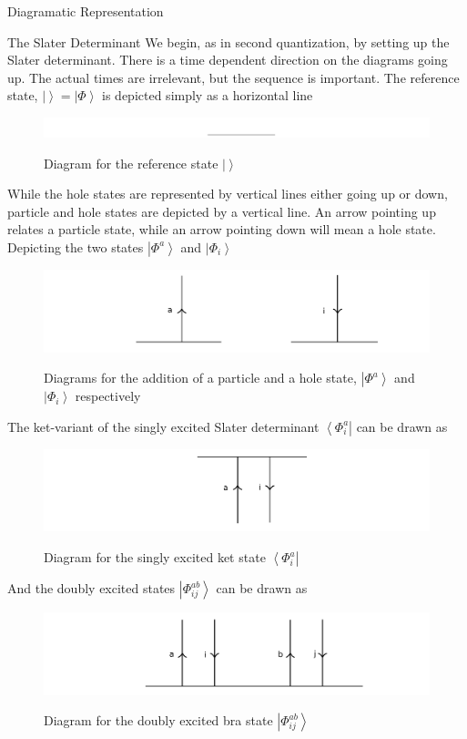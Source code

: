 \documentclass[twoside,english]{uiofysmaster}
\begin{document}
\begin{chapter}{Diagramatic Representation}
	\begin{section}{The Slater Determinant}
		We begin, as in second quantization, by setting up the Slater determinant. There is a time dependent direction on the diagrams going up. The actual times are irrelevant, but the sequence is important. The reference state, $| \left. \right> = \left| \Phi \right>$ is depicted simply as a horizontal line
		\begin{figure}[H]
		\includegraphics[width=\textwidth]{Figures/SlaterDeterminant1.pdf}
		\label{SlaterDeterminant1}
		\caption{Diagram for the reference state $| \left. \right>$}
		\end{figure}
		While the hole states are represented by vertical lines either going up or down, particle and hole states are depicted by a vertical line. An arrow pointing up relates a particle state, while an arrow pointing down will mean a hole state. Depicting the two states $\left| \Phi^a \right> $ and $\left| \Phi_i \right>$
		\begin{figure}[H]
			\includegraphics[width=\textwidth]{Figures/SlaterDeterminant2.pdf}
			\label{SlaterDeterminant2}
			\caption{Diagrams for the addition of a particle and a hole state, $\left| \Phi^a \right> $ and $\left| \Phi_i \right> $ respectively}
		\end{figure}
		The ket-variant of the singly excited Slater determinant $\left< \Phi_i^a \right| $ can be drawn as
		\begin{figure}[H]
			\includegraphics[width=\textwidth]{Figures/SlaterDeterminant3.pdf}
			\label{SlaterDeterminant3}
			\caption{Diagram for the singly excited ket state $\left< \Phi_i^a \right|$}
		\end{figure}
		And the doubly excited states $\left| \Phi_{ij}^{ab} \right>$ can be drawn as
		\begin{figure}[H]
			\includegraphics[width=\textwidth]{Figures/SlaterDeterminant4.pdf}
			\label{SlaterDeterminant4}
			\caption{Diagram for the doubly excited bra state $\left| \Phi_{ij}^{ab} \right>$}
		\end{figure}
	\end{section}


\end{chapter}
\end{document}
